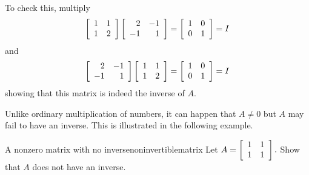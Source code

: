 \begin{solution} To check this, multiply
\begin{equation*}
\left[
\begin{array}{rr}
1 & 1 \\
1 & 2
\end{array}
\right] \left[
\begin{array}{rr}
2 & -1 \\
-1 & 1
\end{array}
\right] =\allowbreak \left[
\begin{array}{rr}
1 & 0 \\
0 & 1
\end{array}
\right] = I 
\end{equation*}
and
\begin{equation*}
\left[
\begin{array}{rr}
2 & -1 \\
-1 & 1
\end{array}
\right] \left[
\begin{array}{rr}
1 & 1 \\
1 & 2
\end{array}
\right] =\allowbreak \left[
\begin{array}{rr}
1 & 0 \\
0 & 1
\end{array}
\right] = I 
\end{equation*}
showing that this matrix is indeed the inverse of $A.$
\end{solution}

Unlike ordinary multiplication of numbers, it can happen that $A\neq 0$ but 
$A$ may fail to have an inverse. This is illustrated in the following example.

\begin{example}{A nonzero matrix with no inverse}{noninvertiblematrix}
Let $A=\left[
\begin{array}{rr}
1 & 1 \\
1 & 1
\end{array}
\right] .$ Show that $A$ does not have an inverse.
\end{example}

